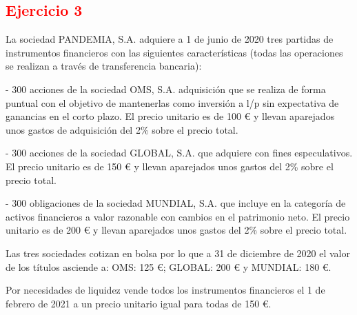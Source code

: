 \newpage
\subsection*{\textcolor{red}{\textbf{Ejercicio 3}}}

La sociedad PANDEMIA, S.A. adquiere a 1 de junio de 2020 tres partidas de instrumentos financieros con las siguientes características (todas las operaciones se realizan a través de transferencia bancaria):

- 300 acciones de la sociedad OMS, S.A. adquisición que se realiza de forma puntual con el objetivo de mantenerlas como inversión a l/p sin expectativa de ganancias en el corto plazo. El precio unitario es de 100 € y llevan aparejados unos gastos de adquisición del 2\% sobre el precio total.

- 300 acciones de la sociedad GLOBAL, S.A. que adquiere con fines especulativos. El precio unitario es de 150 € y llevan aparejados unos gastos del 2\% sobre el precio total.

- 300 obligaciones de la sociedad MUNDIAL, S.A. que incluye en la categoría de activos financieros a valor razonable con cambios en el patrimonio neto. El precio unitario es de 200 € y llevan aparejados unos gastos del 2\% sobre el precio total.

Las tres sociedades cotizan en bolsa por lo que a 31 de diciembre de 2020 el valor de los títulos asciende a: OMS: 125 €; GLOBAL: 200 € y MUNDIAL: 180 €.

Por necesidades de liquidez vende todos los instrumentos financieros el 1 de febrero de 2021 a un precio unitario igual para todas de 150 €.

